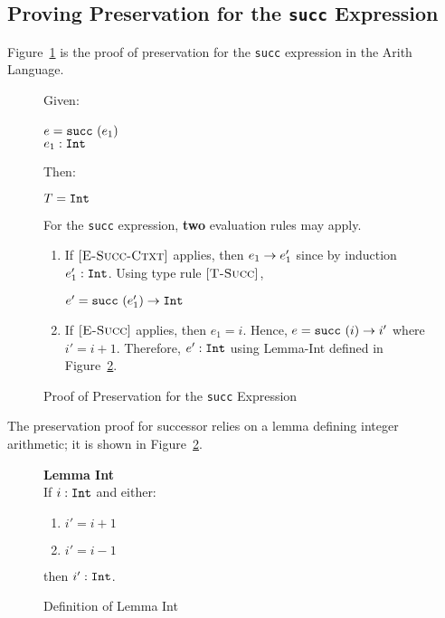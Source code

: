 \documentclass{report}
\newcommand{\rel}[1]{\mbox{\sc [#1]}}
\begin{document}
\eject
\subsection{Proving Preservation for the \texttt{succ} Expression}

Figure~\ref{fig:succProofPreservation} is the proof of preservation for the \texttt{succ} expression in the Arith Language.

\begin{figure}[ht!]
Given:
\begin{center}
   $e = \mbox{\tt succ}~(e_1)$~\\
   ${e_1} : {\mbox{\tt Int}}$
\end{center}
Then:
\begin{center}
   $T = \mbox{\tt Int}$
\end{center}
For the \texttt{succ} expression, \textbf{two} evaluation rules may apply.
\begin{enumerate}

    \item If $\rel{E-Succ-Ctxt}$ applies, then ${e_1} \rightarrow {e'_1}$ since by induction ${e'_1} : {\mbox{\tt Int}}$.  Using type rule $\rel{T-Succ}$,
    
    \begin{center}
      ${e' = \mbox{\tt succ}~(e'_1)} \rightarrow {\mbox{\tt Int}}$
    \end{center}
      
    \item If $\rel{E-Succ}$ applies, then $e_1 = i$.  Hence, ${e = \mbox{\tt succ}~(i)} \rightarrow {i'}$ where $i' = i + 1$.  Therefore, ${e'} : {\mbox{\tt Int}}$ using Lemma-Int defined in Figure~\ref{fig:lemmaInt}.
    
\end{enumerate}
	
  \caption{Proof of Preservation for the \texttt{succ} Expression}\label{fig:succProofPreservation}
\end{figure} 

The preservation proof for successor relies on a lemma defining integer arithmetic; it is shown in Figure~\ref{fig:lemmaInt}.

\begin{figure}[ht!]

\textbf{Lemma Int}~\\

If ${i} : {\mbox{\tt Int}}$ and either:

\begin{enumerate}

    \item $i' = i + 1$
      
    \item $i' = i - 1$
    
\end{enumerate}

then ${i'} : {\mbox{\tt Int}}$.
	
  \caption{Definition of Lemma Int}\label{fig:lemmaInt}
\end{figure} 
\end{document}
